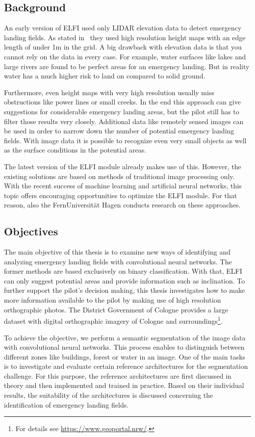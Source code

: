 \subsection{Background}
An early version of ELFI used only LIDAR elevation data to detect emergency landing fields. As stated in~\cite{feu_elfi} they used high resolution height maps with an edge length of under 1m in the grid. A big drawback with elevation data is that you cannot rely on the data in every case. For example, water surfaces like lakes and large rivers are found to be perfect areas for an emergency landing. But in reality water has a much higher risk to land on compared to solid ground.

Furthermore, even height maps with very high resolution usually miss obstructions like power lines or small creeks. In the end this approach can give suggestions for considerable emergency landing areas, but the pilot still has to filter those results very closely. Additional data like remotely sensed images can be used in order to narrow down the number of potential emergency landing fields. With image data it is possible to recognize even very small objects as well as the surface conditions in the potential areas.

The latest version of the ELFI module already makes use of this. However, the existing solutions are based on methods of traditional image processing only. With the recent success of machine learning and artificial neural networks, this topic offers encouraging opportunities to optimize the ELFI module. For that reason, also the FernUniversität Hagen conducts research on these approaches.

\subsection{Objectives}
The main objective of this thesis is to examine new ways of identifying and analyzing emergency landing fields with convolutional neural networks. The former methods are based exclusively on binary classification. With that, ELFI can only suggest potential areas and provide information such as inclination. To further support the pilot's decision making, this thesis investigates how to make more information available to the pilot by making use of high resolution orthographic photos. The District Government of Cologne provides a large dataset with digital orthographic imagery of Cologne and surroundings\footnote{For details see \url{https://www.geoportal.nrw/}.}.

To achieve the objective, we perform a semantic segmentation of the image data with convolutional neural networks. This process enables to distinguish between different zones like buildings, forest or water in an image. One of the main tasks is to investigate and evaluate certain reference architectures for the segmentation challenge. For this purpose, the reference architectures are first discussed in theory and then implemented and trained in practice. Based on their individual results, the suitability of the architectures is discussed concerning the identification of emergency landing fields.

